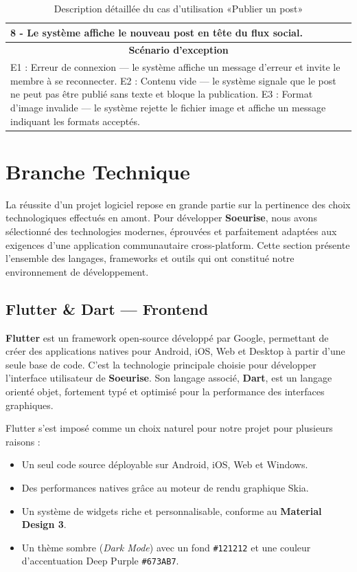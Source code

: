 \documentclass[12pt,a4paper]{report}
\begin{document}
\begin{table}[H]
\begin{tabular}{|p{3.5cm}|p{9.5cm}|}
{				8 - Le système affiche le nouveau post en tête du flux social.%
			} \\
			\hline
			\multicolumn{2}{|c|}{\textbf{Scénario d'exception}} \\
			\hline
			\multicolumn{2}{|p{13cm}|}{%
				E1 : Erreur de connexion — le système affiche un message d'erreur et invite le membre à se reconnecter.\newline
				E2 : Contenu vide — le système signale que le post ne peut pas être publié sans texte et bloque la publication.\newline
				E3 : Format d'image invalide — le système rejette le fichier image et affiche un message indiquant les formats acceptés.%
			} \\
			\hline
		\end{tabular}
		\caption{Description détaillée du cas d'utilisation «Publier un post»}
		\label{tab:uc-publier-post}
	\end{table}
	\section{Branche Technique}
	
	La réussite d'un projet logiciel repose en grande partie sur la pertinence des 
	choix technologiques effectués en amont. Pour développer \textbf{Soeurise}, nous 
	avons sélectionné des technologies modernes, éprouvées et parfaitement adaptées 
	aux exigences d'une application communautaire cross-platform. Cette section présente 
	l'ensemble des langages, frameworks et outils qui ont constitué notre environnement 
	de développement.
	
	\subsection{Flutter \& Dart — Frontend}
	
	\textbf{Flutter} est un framework open-source développé par Google, permettant de 
	créer des applications natives pour Android, iOS, Web et Desktop à partir d'une 
	seule base de code. C'est la technologie principale choisie pour développer 
	l'interface utilisateur de \textbf{Soeurise}. Son langage associé, \textbf{Dart}, 
	est un langage orienté objet, fortement typé et optimisé pour la performance des 
	interfaces graphiques.
	
	Flutter s'est imposé comme un choix naturel pour notre projet pour plusieurs raisons :
	\begin{itemize}
		\item Un seul code source déployable sur Android, iOS, Web et Windows.
		\item Des performances natives grâce au moteur de rendu graphique Skia.
		\item Un système de widgets riche et personnalisable, conforme au 
		\textbf{Material Design 3}.
		\item Un thème sombre (\textit{Dark Mode}) avec un fond \texttt{\#121212} 
		et une couleur d'accentuation Deep Purple \texttt{\#673AB7}.
	\end{itemize}
	
\end{document}
